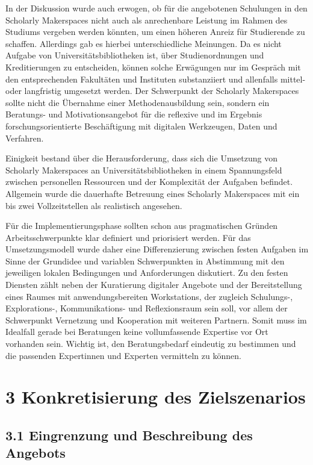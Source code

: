 \documentclass[a4paper,
fontsize=11pt,
oneside,
numbers=noperiodatend,
parskip=half-,
bibliography=totoc,
final
]{scrartcl}
\begin{document}
In der Diskussion wurde auch erwogen, ob für die angebotenen Schulungen
in den Scholarly Makerspaces nicht auch als anrechenbare Leistung im
Rahmen des Studiums vergeben werden könnten, um einen höheren Anreiz für
Studierende zu schaffen. Allerdings gab es hierbei unterschiedliche
Meinungen. Da es nicht Aufgabe von Universitätsbibliotheken ist, über
Studienordnungen und Kreditierungen zu entscheiden, können solche
Erwägungen nur im Gespräch mit den entsprechenden Fakultäten und
Instituten substanziiert und allenfalls mittel- oder langfristig
umgesetzt werden. Der Schwerpunkt der Scholarly Makerspaces sollte nicht
die Übernahme einer Methodenausbildung sein, sondern ein Beratungs- und
Motivationsangebot für die reflexive und im Ergebnis
forschungsorientierte Beschäftigung mit digitalen Werkzeugen, Daten und
Verfahren.

Einigkeit bestand über die Herausforderung, dass sich die Umsetzung von
Scholarly Makerspaces an Universitätsbibliotheken in einem Spannungsfeld
zwischen personellen Ressourcen und der Komplexität der Aufgaben
befindet. Allgemein wurde die dauerhafte Betreuung eines Scholarly
Makerspaces mit ein bis zwei Vollzeitstellen als realistisch angesehen.

Für die Implementierungsphase sollten schon aus pragmatischen Gründen
Arbeitsschwerpunkte klar definiert und priorisiert werden. Für das
Umsetzungsmodell wurde daher eine Differenzierung zwischen festen
Aufgaben im Sinne der Grundidee und variablen Schwerpunkten in
Abstimmung mit den jeweiligen lokalen Bedingungen und Anforderungen
diskutiert. Zu den festen Diensten zählt neben der Kuratierung digitaler
Angebote und der Bereitstellung eines Raumes mit anwendungsbereiten
Workstations, der zugleich Schulungs-, Explorations-, Kommunikations-
und Reflexionsraum sein soll, vor allem der Schwerpunkt Vernetzung und
Kooperation mit weiteren Partnern. Somit muss im Idealfall gerade bei
Beratungen keine vollumfassende Expertise vor Ort vorhanden sein.
Wichtig ist, den Beratungsbedarf eindeutig zu bestimmen und die
passenden Expertinnen und Experten vermitteln zu können.

\hypertarget{konkretisierung-des-zielszenarios}{%
\section{3 Konkretisierung des
Zielszenarios}\label{konkretisierung-des-zielszenarios}}

\hypertarget{eingrenzung-und-beschreibung-des-angebots}{%
\subsection{3.1 Eingrenzung und Beschreibung des
Angebots}\label{eingrenzung-und-beschreibung-des-angebots}}
\end{document}
